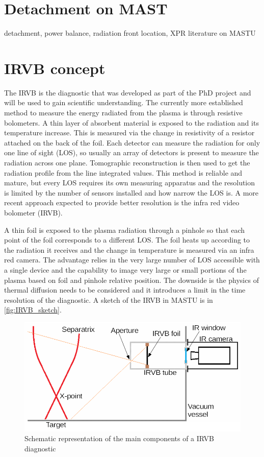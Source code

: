 
\section{Detachment on MAST}
detachment, power balance, radiation front location, XPR literature on MASTU



\section{IRVB concept}
The IRVB is the diagnostic that was developed as part of the PhD project and will be used to gain scientific understanding.
The currently more established method to measure the energy radiated from the plasma is through resistive bolometers. A thin layer of absorbent material is exposed to the radiation and its temperature increase. This is measured via the change in resistivity of a resistor attached on the back of the foil. Each detector can measure the radiation for only one line of sight (LOS), so usually an array of detectors is present to measure the radiation across one plane. Tomographic reconstruction is then used to get the radiation profile from the line integrated values. This method is reliable and mature, but every LOS requires its own measuring apparatus and the resolution is limited by the number of sensors installed and how narrow the LOS is. A more recent approach expected to provide better resolution is the infra red video bolometer (IRVB). 

A thin foil is exposed to the plasma radiation through a pinhole so that each point of the foil corresponds to a different LOS. The foil heats up according to the radiation it receives and the change in temperature is measured via an infra red camera. The advantage relies in the very large number of LOS accessible with a single device and the capability to image very large or small portions of the plasma based on foil and pinhole relative position. The downside is the physics of thermal diffusion needs to be considered and it introduces a limit in the time resolution of the diagnostic. A sketch of the IRVB in MASTU is in \autoref{fig:IRVB_sketch}.

\begin{figure}
	\centering
	\includegraphics[width=\linewidth]{Chapters/chapter2/figs/IRVB cartoon.png}
	\caption{Schematic representation of the main components of a IRVB diagnostic}
	\label{fig:IRVB_sketch}
\end{figure}

